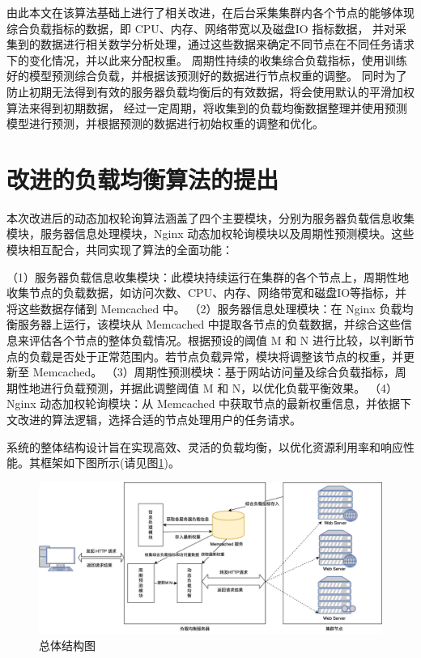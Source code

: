 由此本文在该算法基础上进行了相关改进，在后台采集集群内各个节点的能够体现综合负载指标的数据，即 CPU、内存、网络带宽以及磁盘IO 指标数据，
并对采集到的数据进行相关数学分析处理，通过这些数据来确定不同节点在不同任务请求下的变化情况，并以此来分配权重。
周期性持续的收集综合负载指标，使用训练好的模型预测综合负载，并根据该预测好的数据进行节点权重的调整。
同时为了防止初期无法得到有效的服务器负载均衡后的有效数据，将会使用默认的平滑加权算法来得到初期数据，
经过一定周期，将收集到的负载均衡数据整理并使用预测模型进行预测，并根据预测的数据进行初始权重的调整和优化。

\section{改进的负载均衡算法的提出}
本次改进后的动态加权轮询算法涵盖了四个主要模块，分别为服务器负载信息收集模块，服务器信息处理模块，Nginx 动态加权轮询模块以及周期性预测模块。这些模块相互配合，共同实现了算法的全面功能：

（1）服务器负载信息收集模块：此模块持续运行在集群的各个节点上，周期性地收集节点的负载数据，如访问次数、CPU、内存、网络带宽和磁盘IO等指标，并将这些数据存储到 Memcached 中。
（2）服务器信息处理模块：在 Nginx 负载均衡服务器上运行，该模块从 Memcached 中提取各节点的负载数据，并综合这些信息来评估各个节点的整体负载情况。根据预设的阈值 M 和 N 进行比较，以判断节点的负载是否处于正常范围内。若节点负载异常，模块将调整该节点的权重，并更新至 Memcached。
（3）周期性预测模块：基于网站访问量及综合负载指标，周期性地进行负载预测，并据此调整阈值 M 和 N，以优化负载平衡效果。
（4）Nginx 动态加权轮询模块：从 Memcached 中获取节点的最新权重信息，并依据下文改进的算法逻辑，选择合适的节点处理用户的任务请求。

系统的整体结构设计旨在实现高效、灵活的负载均衡，以优化资源利用率和响应性能。其框架如下图所示(请见图\ref{total_structure_flow})。

\begin{figure}[htbp]
	\centering
	\includegraphics[width=\textwidth]{figures/landbalance_module.png}
	\caption{总体结构图}
	\label{total_structure_flow}
\end{figure}

